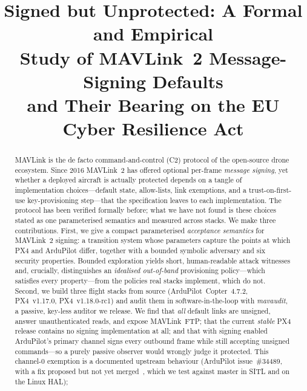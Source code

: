 \documentclass[conference]{IEEEtran}
\begin{document}
\title{Signed but Unprotected: A Formal and Empirical\\ Study of MAVLink~2 Message-Signing Defaults\\ and Their Bearing on the EU Cyber Resilience Act}

\author{
}

\maketitle

\begin{abstract}
MAVLink is the de facto command-and-control (C2) protocol of the open-source
drone ecosystem. Since 2016 MAVLink~2 has offered optional per-frame
\emph{message signing}, yet whether a deployed aircraft is actually protected
depends on a tangle of implementation choices---default state, allow-lists,
link exemptions, and a trust-on-first-use key-provisioning step---that the
specification leaves to each implementation. The protocol has been verified
formally before; what we have not found is these choices stated as one
parameterised semantics and measured across stacks. We make three contributions.
First, we give a compact parameterised \emph{acceptance semantics} for MAVLink~2
signing: a transition system whose parameters capture the points at which
PX4 and ArduPilot differ, together with a bounded symbolic adversary and six
security properties. Bounded exploration yields short, human-readable attack
witnesses and, crucially, distinguishes an \emph{idealised out-of-band}
provisioning policy---which satisfies every property---from the policies real
stacks implement, which do not. Second, we build three flight stacks from
source (ArduPilot~Copter~4.7.2, PX4~v1.17.0, PX4~v1.18.0-rc1) and audit them in
software-in-the-loop with \emph{mavaudit}, a passive, key-less auditor we
release. We find that \emph{all} default links are unsigned, answer
unauthenticated reads, and expose MAVLink~FTP; that the current \emph{stable}
PX4 release contains no signing implementation at all; and that with signing
enabled ArduPilot's primary channel signs every outbound frame while still
accepting unsigned commands---so a purely passive observer would wrongly judge
it protected. This channel-0 exemption is a documented upstream behaviour
(ArduPilot issue~\#34489, with a fix proposed but not yet merged~\cite{ardupilot_issue34489,ardupilot_pr34780}, which we test against master in SITL and on the Linux HAL);

\end{abstract}
\end{document}

